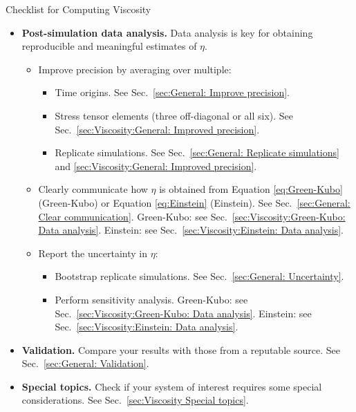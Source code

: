 \documentclass[9pt,bestpractices]{livecoms}
\begin{document}
\begin{Checklists*}[p!]
\begin{checklist}{Checklist for Computing Viscosity}
\begin{itemize}
			\item
			\textbf{Post-simulation data analysis.} Data analysis is key for obtaining reproducible and meaningful estimates of $\eta$.
			\vspace{-0.325\baselineskip} %
			\begin{itemize}
				\item Improve precision by averaging over multiple:
				\begin{itemize}
					\item Time origins. See Sec.\ \ref{sec:General: Improve precision}.
					\item Stress tensor elements (three off-diagonal or all six). See Sec.\ \ref{sec:Viscosity:General: Improved precision}.
					\item Replicate simulations. See Sec.\ \ref{sec:General: Replicate simulations} and \ref{sec:Viscosity:General: Improved precision}.
				\end{itemize}
				\item Clearly communicate how $\eta$ is obtained from Equation \ref{eq:Green-Kubo} (Green-Kubo) or Equation \ref{eq:Einstein} (Einstein). See Sec.\ \ref{sec:General: Clear communication}. Green-Kubo: see Sec.\ \ref{sec:Viscosity:Green-Kubo: Data analysis}. Einstein: see Sec.\ \ref{sec:Viscosity:Einstein: Data analysis}.
				\item Report the uncertainty in $\eta$:
				\begin{itemize}
					\item Bootstrap replicate simulations. See Sec.\ \ref{sec:General: Uncertainty}.
					\item Perform sensitivity analysis. Green-Kubo: see Sec.\ \ref{sec:Viscosity:Green-Kubo: Data analysis}. Einstein: see Sec.\ \ref{sec:Viscosity:Einstein: Data analysis}.
				\end{itemize}
			\end{itemize}
			\vspace{-0.325\baselineskip} %
			
			\item
			\textbf{Validation.} Compare your results with those from a reputable source. See Sec.\ \ref{sec:General: Validation}.
			
			\item
			\textbf{Special topics.} Check if your system of interest requires some special considerations. See Sec.\ \ref{sec:Viscosity Special topics}.
			
		\end{itemize}
	\end{checklist}
\end{Checklists*}
\end{document}

